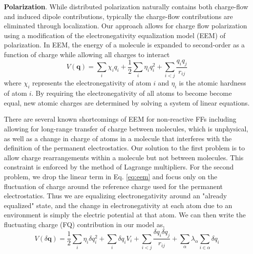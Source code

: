\documentclass[journal=jctcce,manuscript=article]{achemso}
\begin{document}
\textbf{Polarization}. While distributed polarization naturally contains both charge-flow and induced dipole contributions\cite{stone1985distributedb}, typically the charge-flow contributions are eliminated through localization.\cite{ruth1994localization} Our approach allows for charge flow polarization using a modification of the electronegativity equalization model (EEM) of polarization.\cite{mortier1986electronegativity} In EEM, the energy of a molecule is expanded to second-order as a function of charge while allowing all charges to interact
\begin{equation}
  V(\bm{q})=\sum_i \chi_i q_i + \frac12 \sum_i \eta_i q_i^2 + \sum_{i<j} \frac{q_i q_j}{r_{ij}}
  \label{eq:eem}
\end{equation} where $\chi_i$ represents the electronegativity of atom $i$ and $\eta_i$ is the atomic hardness of atom $i$. By requiring the electronegativity of all atoms to become become equal, new atomic charges are determined by solving a system of linear equations. 

There are several known shortcomings of EEM for non-reactive FFs including allowing for long-range transfer of charge between molecules, which is unphysical,\cite{chen2007qtpie,chen2008unified} as well as a change in charge of atoms in a molecule that interferes with the definition of the permanent electrostatics. Our solution to the first problem is to allow charge rearrangements within a molecule but not between molecules. This constraint is enforced by the method of Lagrange multipliers. For the second problem, we drop the linear term in Eq. \ref{eq:eem} and focus only on the fluctuation of charge around the reference charge used for the permanent electrostatics. Thus we are equalizing electronegativity around an "already equalized" state, and the change in electronegativity at each atom due to an environment is simply the electric potential at that atom. We can then write the fluctuating charge (FQ) contribution in our model as,
\begin{equation}
  V(\delta \bm{q})=\frac12\sum_i \eta_i \delta q_i^2 + \sum_i \delta q_i V_i + \sum_{i<j}\frac{\delta q_i \delta q_j}{r_{ij}} + \sum_{\alpha}\lambda_\alpha \sum_{i\in\alpha}\delta q_{i}
  \label{eq:fq}
\end{equation}
\end{document}
